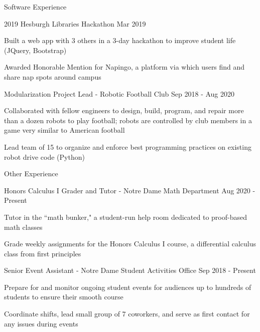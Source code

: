 \documentclass[10pt]{resume} %
\begin{document}
\begin{rSection}{ Software Experience }
\begin{rSubsection}{ 2019 Hesburgh Libraries Hackathon }{ Mar 2019 }{}{}
\item Built a web app with 3 others in a 3-day hackathon to improve student life (JQuery, Bootstrap)
\item Awarded Honorable Mention for Napingo, a platform via which users find and share nap spots around campus
\end{rSubsection}

\begin{rSubsection}{ Modularization Project Lead - Robotic Football Club }{ Sep 2018 - Aug 2020 }{}{}
\item Collaborated with fellow engineers to design, build, program, and repair more than a dozen robots to play football; robots are controlled by club members in a game very similar to American football
\item Lead team of 15 to organize and enforce best programming practices on existing robot drive code (Python)
\end{rSubsection}

\end{rSection}


\begin{rSection}{Other Experience}

\begin{rSubsection}{ Honors Calculus I Grader and Tutor - Notre Dame Math Department }{ Aug 2020 - Present }{}{}
\item Tutor in the ``math bunker," a student-run help room dedicated to proof-based math classes
\item Grade weekly assignments for the Honors Calculus I course, a differential calculus class from first principles
\end{rSubsection}


\begin{rSubsection}{ Senior Event Assistant - Notre Dame Student Activities Office }{ Sep 2018 - Present }{}{}
\item Prepare for and monitor ongoing student events for audiences up to hundreds of students to ensure their smooth course
\item Coordinate shifts, lead small group of 7 coworkers, and serve as first contact for any issues during events
\end{rSubsection}

\end{rSection}
\end{document}
